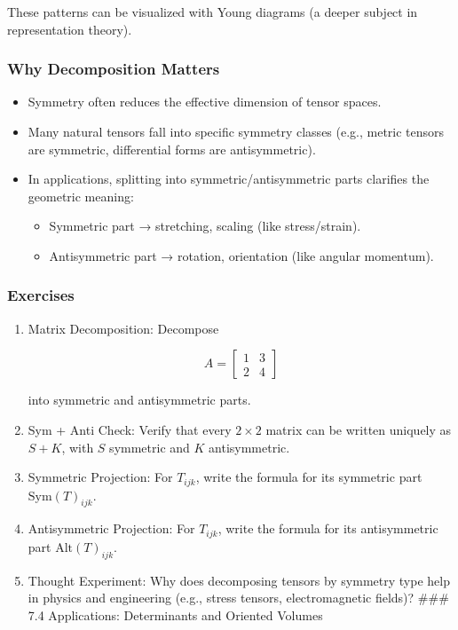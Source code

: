 \documentclass[
  letterpaper,
  DIV=11,
  numbers=noendperiod]{scrreprt}
\providecommand{\tightlist}{%
  \setlength{\itemsep}{0pt}\setlength{\parskip}{0pt}}
\begin{document}
These patterns can be visualized with Young diagrams (a deeper subject
in representation theory).

\subsubsection{Why Decomposition
Matters}\label{why-decomposition-matters}

\begin{itemize}
\item
  Symmetry often reduces the effective dimension of tensor spaces.
\item
  Many natural tensors fall into specific symmetry classes (e.g., metric
  tensors are symmetric, differential forms are antisymmetric).
\item
  In applications, splitting into symmetric/antisymmetric parts
  clarifies the geometric meaning:

  \begin{itemize}
  \tightlist
  \item
    Symmetric part → stretching, scaling (like stress/strain).
  \item
    Antisymmetric part → rotation, orientation (like angular momentum).
  \end{itemize}
\end{itemize}

\subsubsection{Exercises}\label{exercises-26}

\begin{enumerate}
\def\labelenumi{\arabic{enumi}.}
\item
  Matrix Decomposition: Decompose

  \[
  A = \begin{bmatrix}1 & 3 \\ 2 & 4\end{bmatrix}
  \]

  into symmetric and antisymmetric parts.
\item
  Sym + Anti Check: Verify that every \(2 \times 2\) matrix can be
  written uniquely as \(S + K\), with \(S\) symmetric and \(K\)
  antisymmetric.
\item
  Symmetric Projection: For \(T_{ijk}\), write the formula for its
  symmetric part \(\mathrm{Sym}(T)_{ijk}\).
\item
  Antisymmetric Projection: For \(T_{ijk}\), write the formula for its
  antisymmetric part \(\mathrm{Alt}(T)_{ijk}\).
\item
  Thought Experiment: Why does decomposing tensors by symmetry type help
  in physics and engineering (e.g., stress tensors, electromagnetic
  fields)? \#\#\# 7.4 Applications: Determinants and Oriented Volumes
\end{enumerate}
\end{document}
